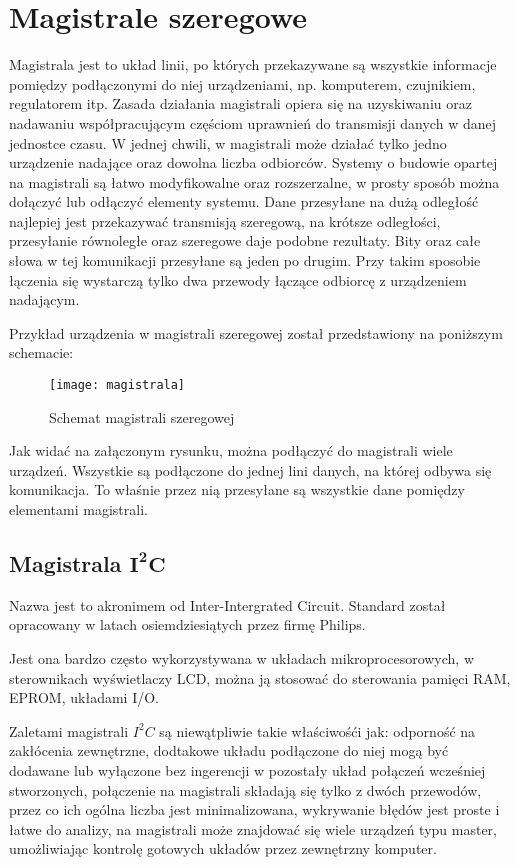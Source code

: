 \chapter{Magistrale szeregowe}
Magistrala jest to układ linii, po których przekazywane są wszystkie informacje pomiędzy podłączonymi do niej urządzeniami, np. komputerem, czujnikiem, regulatorem itp. Zasada działania magistrali opiera się na uzyskiwaniu oraz nadawaniu współpracującym częściom uprawnień do transmisji danych w danej jednostce czasu. W jednej chwili, w magistrali może działać tylko jedno urządzenie nadające oraz dowolna liczba odbiorców. Systemy o budowie opartej na magistrali są łatwo modyfikowalne oraz rozszerzalne, w prosty sposób można dołączyć lub odłączyć elementy systemu.
Dane przesyłane na dużą odległość najlepiej jest przekazywać transmisją szeregową, na krótsze odległości, przesyłanie równoległe oraz szeregowe daje podobne rezultaty.
Bity oraz całe słowa w tej komunikacji przesyłane są jeden po drugim. Przy takim sposobie łączenia się wystarczą tylko dwa przewody łączące odbiorcę z urządzeniem nadającym. 

Przykład urządzenia w magistrali szeregowej został przedstawiony na poniższym schemacie:
\begin{figure}[h]
\centering
\texttt{[image: magistrala]}
\caption{Schemat magistrali szeregowej}
\label{fig:magistrala}
\end{figure}

Jak widać na załączonym rysunku, można podłączyć do magistrali wiele urządzeń. Wszystkie są podłączone do jednej lini danych, na której odbywa się komunikacja. To właśnie przez nią przesyłane są wszystkie dane pomiędzy elementami magistrali.

\section{Magistrala $\mathbf{I^{2}C}$}
Nazwa jest to akronimem od Inter-Intergrated Circuit. Standard został opracowany w latach osiemdziesiątych przez firmę Philips.

Jest ona bardzo często wykorzystywana w układach mikroprocesorowych, w sterownikach wyświetlaczy LCD, można ją stosować do sterowania pamięci RAM, EPROM, układami I/O.

Zaletami magistrali $I^{2}C$ są niewątpliwie takie właściwośći jak: odporność na zakłócenia zewnętrzne, dodtakowe układu podłączone do niej mogą być dodawane lub wyłączone bez ingerencji w pozostały układ połączeń wcześniej stworzonych, połączenie na magistrali składają się tylko z dwóch przewodów, przez co ich ogólna liczba jest minimalizowana, wykrywanie błędów jest proste i łatwe do analizy, na magistrali może znajdować się wiele urządzeń typu master, umożliwiając kontrolę gotowych układów przez zewnętrzny komputer.

